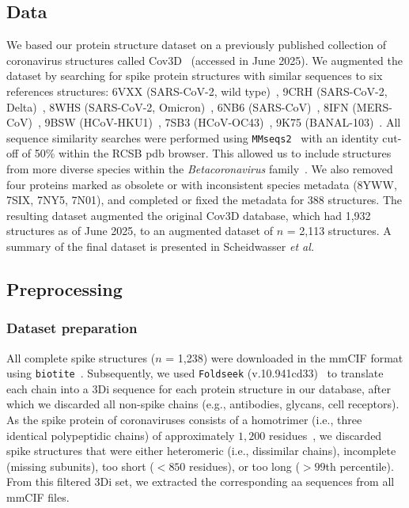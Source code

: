 \subsection{Data}
We based our protein structure dataset on a previously published collection of coronavirus structures called Cov3D~\cite{gowthaman2021} (accessed in June 2025). We augmented the dataset by searching for spike protein structures with similar sequences to six references structures: 6VXX (SARS-CoV-2, wild type)~\cite{walls2020}, 9CRH (SARS-CoV-2, Delta)~\cite{ke2024}, 8WHS (SARS-CoV-2, Omicron)~\cite{liu2024}, 6NB6 (SARS-CoV)~\cite{walls2019}, 8IFN (MERS-CoV)~\cite{tian2024}, 9BSW (HCoV-HKU1)~\cite{jin2025}, 7SB3 (HCoV-OC43)~\cite{bangaru2022}, 9K75 (BANAL-103)~\cite{qingqing2025}. All sequence similarity searches were performed using \texttt{MMseqs2}~\cite{steinegger2017} with an identity cut-off of 50\% within the RCSB \gls{pdb} browser. This allowed us to include structures from more diverse species within the \textit{Betacoronavirus} family~\cite{hu2021}. We also removed four proteins marked as obsolete or with inconsistent species metadata (8YWW, 7SIX, 7NY5, 7N01), and completed or fixed the metadata for 388 structures. The resulting dataset augmented the original Cov3D database, which had 1,932 structures as of June 2025, to an augmented dataset of $n$ = 2,113 structures. A summary of the final dataset is presented in Scheidwasser \textit{et al.}~\cite{scheidwasser2025a}

% 

\subsection{Preprocessing}

% 

\subsubsection{Dataset preparation}
All complete spike structures ($n$ = 1,238) were downloaded in the mmCIF format using \texttt{biotite}~\cite{kunzmann2018}. Subsequently, we used \texttt{Foldseek} (v.10.941cd33)~\cite{vankempen2024} to translate each chain into a 3Di sequence for each protein structure in our database, after which we discarded all non-spike chains (e.g., antibodies, glycans, cell receptors). As the spike protein of coronaviruses consists of a homotrimer (i.e., three identical polypeptidic chains) of approximately $1,200$ residues~\cite{li2016}, we discarded spike structures that were either heteromeric (i.e., dissimilar chains), incomplete (missing subunits), too short ($< 850$ residues), or too long ($> 99$th percentile). From this filtered 3Di set, we extracted the corresponding \gls{aa} sequences from all mmCIF files. 


